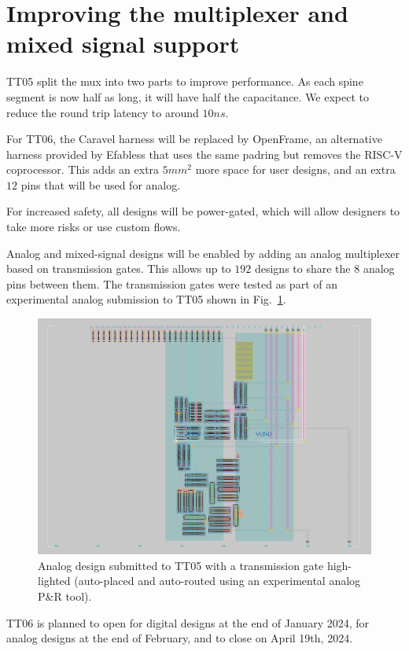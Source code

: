 \section{Improving the multiplexer and mixed signal support}
\label{sec:improving}

TT05 split the mux into two parts to improve performance.
As each spine segment is now half as long, it will have half the capacitance.
We expect to reduce the round trip latency to around \(10 ns\).

For TT06, the Caravel harness will be replaced by OpenFrame\cite{openframe}, an alternative harness provided by Efabless that uses the same padring but removes the RISC-V coprocessor.
This adds an extra \(5 mm^2\) more space for user designs, and an extra \(12\) pins that will be used for analog.

For increased safety, all designs will be power-gated, which will allow designers to take more risks or use custom flows.

Analog and mixed-signal designs will be enabled by adding an analog multiplexer based on transmission gates\cite{transmissiongates}. 
This allows up to \(192\) designs to share the \(8\) analog pins between them.
The transmission gates were tested as part of an experimental analog submission to TT05 shown in Fig.~\ref{fig:transmission_gate_TT05}.

\begin{figure}[htp]
\centering
\includegraphics[width=\columnwidth]{./Figs/tt05_transmission_gate.png}
\caption{Analog design submitted to TT05 with a transmission gate high-lighted (auto-placed and auto-routed using an experimental analog P&R tool).}
\label{fig:transmission_gate_TT05}
\end{figure}

TT06 is planned to open for digital designs at the end of January 2024, for analog designs at the end of February, and to close on April 19th, 2024.
